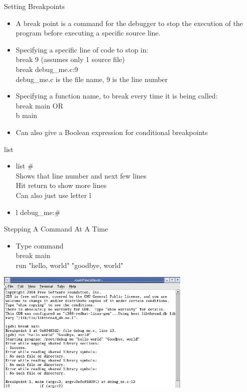 \documentclass{beamer}
\begin{document}
\begin{frame}{Setting Breakpoints}
\begin{itemize}
\item A break point is a command for the debugger to stop the execution of the program before executing a specific source line. 
\item Specifying a specific line of code to stop in: \\
break 9		(assumes only 1 source file)\\
break debug\_me.c:9\\
   debug\_me.c is the file name, 9 is the line number\\
\item Specifying a function name, to break every time it is being called: \\
break main 			OR\\
b main
\item Can also give a Boolean expression for conditional breakpoints
\end{itemize}
\end{frame}

\begin{frame}{list}
\begin{itemize}
\item list \#\\
Shows that line number and next few lines\\
Hit return to show more lines\\
Can also just use letter l\\
\item l debug\_me:\#
\end{itemize}
\end{frame}

\begin{frame}{Stepping A Command At A Time}
\begin{itemize}
\item Type command\\
break main \\
run "hello, world" "goodbye, world"
\end{itemize}
\includegraphics[width=0.7\textwidth]{../imgs/gdb2.png}
\end{frame}
\end{document}
